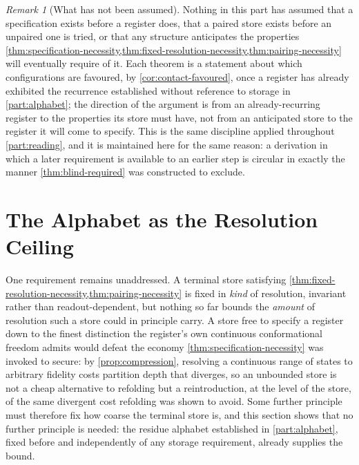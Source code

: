 \documentclass[11pt,twocolumn,a4paper]{article}
\theoremstyle{plain}
\theoremstyle{definition}
\theoremstyle{remark}
\newtheorem{remark}[theorem]{Remark}
\begin{document}
\begin{remark}[What has not been assumed]
\label{rem:hierarchy-not-assumed}
Nothing in this part has assumed that a specification exists before a
register does, that a paired store exists before an unpaired one is
tried, or that any structure anticipates the properties
\cref{thm:specification-necessity,thm:fixed-resolution-necessity,thm:pairing-necessity}
will eventually require of it. Each theorem is a statement about which
configurations are favoured, by \cref{cor:contact-favoured}, once a
register has already exhibited the recurrence established without
reference to storage in \cref{part:alphabet}; the direction of the
argument is from an already-recurring register to the properties its
store must have, not from an anticipated store to the register it will
come to specify. This is the same discipline applied throughout
\cref{part:reading}, and it is maintained here for the same reason: a
derivation in which a later requirement is available to an earlier step
is circular in exactly the manner \cref{thm:blind-required} was
constructed to exclude.
\end{remark}

\section{The Alphabet as the Resolution Ceiling}
\label{sec:alphabet-ceiling}

One requirement remains unaddressed. A terminal store satisfying
\cref{thm:fixed-resolution-necessity,thm:pairing-necessity} is fixed in
\emph{kind} of resolution, invariant rather than readout-dependent, but
nothing so far bounds the \emph{amount} of resolution such a store could
in principle carry. A store free to specify a register down to the finest
distinction the register's own continuous conformational freedom admits
would defeat the economy \cref{thm:specification-necessity} was invoked
to secure: by \cref{prop:compression}, resolving a continuous range of
states to arbitrary fidelity costs partition depth that diverges, so an
unbounded store is not a cheap alternative to refolding but a
reintroduction, at the level of the store, of the same divergent cost
refolding was shown to avoid. Some further principle must therefore fix
how coarse the terminal store is, and this section shows that no further
principle is needed: the residue alphabet established in
\cref{part:alphabet}, fixed before and independently of any storage
requirement, already supplies the bound.
\end{document}
